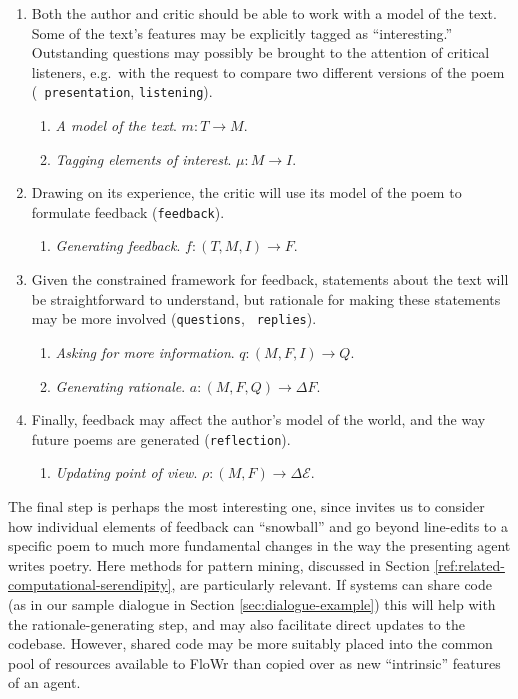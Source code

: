 \begin{enumerate}[label=\Roman*.]
\item Both the author and critic should be able to work with a model
  of the text.  Some of the text's features may be explicitly tagged
  as ``interesting.''  Outstanding questions may possibly be
  brought to the attention of critical listeners, e.g.~with the
  request to compare two different versions of the poem ({\tt
    presentation}, {\tt listening}).
\begin{enumerate}[label=\arabic*.]
\item \emph{A model of the text}. $m: T\rightarrow M$.
\item \emph{Tagging elements of interest}. $\mu: M\rightarrow I$.
\end{enumerate}
\item Drawing on its experience, the critic will use its model of the
  poem to formulate feedback ({\tt feedback}).
\begin{enumerate}[label=\arabic*.]
\item \emph{Generating feedback}. $f: (T,M,I)\rightarrow F$.
\end{enumerate}
\item Given the constrained framework for feedback, statements about
  the text will be straightforward to understand, but rationale for
  making these statements may be more involved ({\tt questions}, {\tt
    replies}).
\begin{enumerate}[label=\arabic*.]
\item \emph{Asking for more information}. $q: (M,F,I) \rightarrow Q$.
\item \emph{Generating rationale}. $a: (M,F,Q) \rightarrow \Delta F$.
\end{enumerate}
\item Finally, feedback may affect the author's model of the world, and the way future poems are generated ({\tt reflection}).
\begin{enumerate}[label=\arabic*.]
\item \emph{Updating point of view}. $\rho: (M,F) \rightarrow \Delta\mathcal{E}$.
\end{enumerate}
\end{enumerate}

The final step is perhaps the most interesting one, since invites us
to consider how individual elements of feedback can ``snowball'' and
go beyond line-edits to a specific poem to much more fundamental
changes in the way the presenting agent writes poetry.  Here methods
for pattern mining, discussed in Section
\ref{ref:related-computational-serendipity}, are particularly relevant.
If systems can share code (as in our sample dialogue in Section
\ref{sec:dialogue-example}) this will help with the
rationale-generating step, and may also facilitate direct updates to
the codebase.  However, shared code may be more suitably placed into
the common pool of resources available to FloWr than copied over as
new ``intrinsic'' features of an agent.

